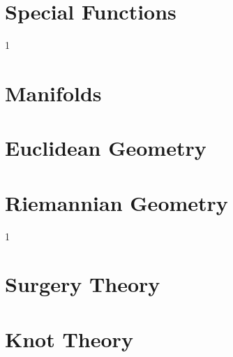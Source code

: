 \documentclass{book}                                                           %
\newcommand*{\TOPPATH}{books}
\newcommand*{\PATH}{\TOPPATH/}
\newcounter{endpage}
\def\compilegeometry{0}
\def\compilegeotop{0}
\begin{document}
            \part{Special Functions}
                
                
        \clearpage
        \setcounter{endpage}{\thepage}
    \fi

    \if\compilegeometry1
            \label{book:Geometry}%
            \renewcommand{\PATH}{\TOPPATH/Geometry}
            \setcounter{page}{\value{endpage}}
            \part{Manifolds}
                
            \part{Euclidean Geometry}
                
            \part{Riemannian Geometry}
                
        \clearpage
        \setcounter{endpage}{\thepage}
    \fi

    \if\compilegeotop1
            \label{book:Geometric_Topology}%
            \renewcommand{\PATH}{\TOPPATH/Geometric_Topology}
            \setcounter{page}{\value{endpage}}
            \part{Surgery Theory}
                
            \part{Knot Theory}
                
        \clearpage
        \setcounter{endpage}{\thepage}
    \fi
\end{document}
